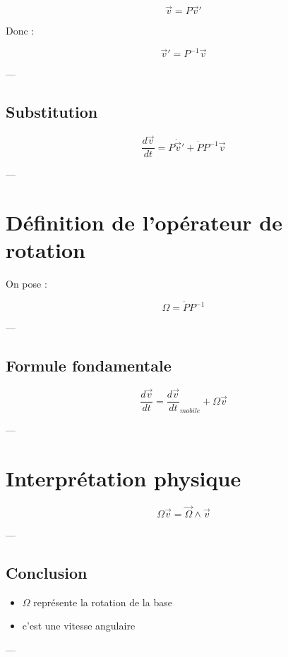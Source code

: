 \documentclass[11pt,a4paper]{article}
\begin{document}
\[
\vec{v} = P\vec{v}'
\]

Donc :

\[
\vec{v}' = P^{-1}\vec{v}
\]

---

\subsection{Substitution}

\[
\frac{d\vec{v}}{dt}
=
P\dot{\vec{v}}' + \dot{P}P^{-1}\vec{v}
\]

---

\section{Définition de l’opérateur de rotation}

On pose :

\[
\boxed{
\Omega = \dot{P}P^{-1}
}
\]

---

\subsection{Formule fondamentale}

\[
\boxed{
\frac{d\vec{v}}{dt}
=
\frac{d\vec{v}}{dt}_{mobile}
+
\Omega \vec{v}
}
\]

---

\section{Interprétation physique}

\[
\Omega \vec{v} = \vec{\Omega} \wedge \vec{v}
\]

---

\subsection{Conclusion}

\begin{itemize}
\item $\Omega$ représente la rotation de la base
\item c’est une vitesse angulaire
\end{itemize}

---
\end{document}
